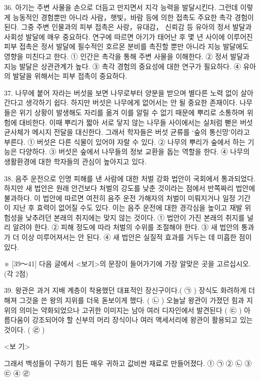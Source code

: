 \documentclass[12pt]{article}
\begin{document}
\begin{enumerate}[1.]
36.
  아기는 주변 사물을 손으로 더듬고 만지면서 지각 능력을 발달시킨다.
그런데 이렇게 능동적인 경험뿐만 아니라 사람，햇빛，바람 등에 의한 접촉도
주요한 촉각 경험이 된다. 그중 주변 인물과의 피부 접촉은 사랑，유대감，
신뢰감 등 유아의 정서 발달과 사회성 발달에 매우 중요하다. 연구에 따르면
아기가 태어난 후 몇 년 사이에 이루어진 피부 접촉은 정서 발달에 필수적인
호르몬 분비를 촉진할 뿐만 아니라 지능 발달에도 영향을 미친다고 한다.
① 인간은 촉각을 통해 주변 사물을 이해한다.
② 정서 발달과 지능 발달은 상관관계가 높다.
③ 촉각 경험의 중요성에 대한 연구가 필요하다.
④ 유아의 발달을 위해서는 피부 접촉이 중요하다.


37.
  나무에 붙어 자라는 버섯을 보면 나무로부터 양분을 받으며 별다른 노력
없이 살아간다고 생각하기 쉽다. 하지만 버섯은 나무에게 없어서는 안 될
중요한 존재이다. 나무들은 위기 상황이 발생해도 자리를 옮겨 이를 알릴
수 없기 때문에 뿌리로 소통하며 위험에 대비한다. 이때 뿌리가 짧아 서로
닿지 않는 나무들 사이에서는 실처럼 뻗은 버섯 균사체가 메시지 전달을
대신한다. 그래서 학자들은 버섯 균류를 ‘숲의 통신망’이라고 부른다.
① 버섯은 다른 식물이 있어야 자랄 수 있다.
② 나무의 뿌리가 숲에서 하는 기능은 다양하다.
③ 버섯은 숲에서 나무들의 정보 교환을 돕는 역할을 한다.
④ 나무의 생활환경에 대한 학자들의 관심이 높아지고 있다.


38.
  음주 운전으로 인명 피해를 낸 사람에 대한 처벌 강화 법안이 국회에서
통과되었다. 하지만 새 법안은 원래 안건보다 처벌의 강도를 낮춘 것이라는
점에서 반쪽짜리 법안에 불과하다. 이 법안에 따르면 여전히 음주 운전
가해자의 처벌이 미뤄지거나 일정 기간이 지난 후 효력이 없어질 수도
있다. 이는 음주 운전에 대한 경각심을 높이고 재발 위험성을 낮추려던
본래의 취지에는 맞지 않는 것이다.
① 법안이 가진 본래의 취지를 널리 알려야 한다.
② 피해 정도에 따라 처벌의 수위를 조절해야 한다.
③ 새 법안의 통과가 더 이상 미루어져서는 안 된다.
④ 새 법안은 실질적 효과를 거두는 데 미흡한 점이 있다.




※ [39～41] 다음 글에서 <보기>의 문장이 들어가기에 가장 알맞은 곳을 고르십시오. (각 2점)

39.
  왕관은 과거 지배 계층이 착용했던 대표적인 장신구이다.( ㉠ ) 장식도
화려하게 더해져 그것을 쓴 왕의 지위를 더욱 돋보이게 했다. ( ㉡ )
오늘날 왕관이 가졌던 힘과 지위의 의미는 약화되었으나 고귀한 이미지는
남아 여러 디자인에서 발견된다 ( ㉢ ) 아름다움이 강조되어야 할 신부의
머리 장식이나 여러 액세서리에 왕관이 활용되고 있는 것이다. ( ㉣ )

<보 기>

그래서 백성들이 구하기 힘든 매우 귀하고 값비싼 재료로 만들어졌다.
① ㉠	② ㉡	③ ㉢	④ ㉣



\end{enumerate}
\end{document}
